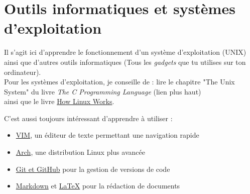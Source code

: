 \documentclass[12pt]{article}
\begin{document}
\section{Outils informatiques et systèmes d'exploitation}
Il s'agit ici d'apprendre le fonctionnement d'un système d'exploitation (UNIX) ainsi que d'autres
outils informatiques (Tous les \textit{gadgets} que tu utilises sur ton ordinateur).\\

Pour les systèmes d'exploitation, je conseille de :
lire le chapitre "The Unix System" du livre \textit{The C Programming Language} (lien plus haut)\\
ainsi que le livre \href{https://www.amazon.com/How-Linux-Works-Brian-Ward/dp/1718500408}{How Linux Works}.

C'est aussi toujours intéressant d'apprendre à utiliser : \\
\begin{itemize}
\item \href{https://www.youtube.com/watch?v=-txKSRn0qeA}{VIM}, un éditeur de texte permettant une navigation rapide
\item \href{https://wiki.archlinux.org/title/archinstall}{Arch}, une distribution Linux plus avancée
\item \href{https://www.youtube.com/watch?v=hwP7WQkmECE}{Git et GitHub} pour la gestion de versions de code
\item \href{https://www.youtube.com/watch?v=-MXwHMHfF8k}{Markdown} et \href{https://www.overleaf.com/learn/latex/Learn_LaTeX_in_30_minutes}{LaTeX} pour la rédaction de documents
\end{itemize}
\end{document}
